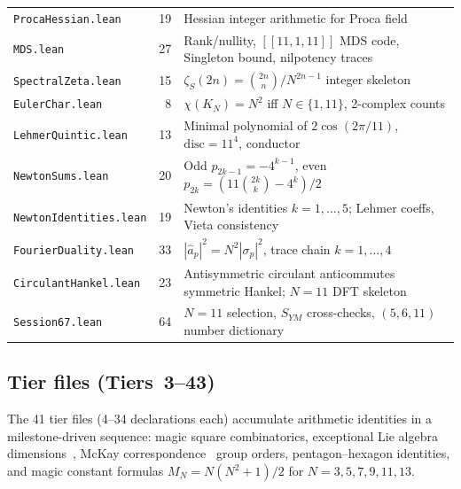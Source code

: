 \documentclass[11pt,a4paper]{article}
\begin{document}
\begin{table}[ht]
\begin{tabular}{lrp{8cm}}
\texttt{ProcaHessian.lean}       & 19 & Hessian integer arithmetic for Proca field \\
\texttt{MDS.lean}                & 27 & Rank/nullity, $[[11,1,11]]$ MDS code,
                                        Singleton bound, nilpotency traces \\
\texttt{SpectralZeta.lean}       & 15 & $\zeta_S(2n)=\binom{2n}{n}/N^{2n-1}$
                                        integer skeleton \\
\texttt{EulerChar.lean}          &  8 & $\chi(K_N)=N^2$ iff $N\in\{1,11\}$,
                                        2-complex counts \\
\texttt{LehmerQuintic.lean}      & 13 & Minimal polynomial of $2\cos(2\pi/11)$,
                                        $\mathrm{disc}=11^4$, conductor \\
\texttt{NewtonSums.lean}         & 20 & Odd $p_{2k-1}=-4^{k-1}$, even
                                        $p_{2k}=(11\binom{2k}{k}-4^k)/2$ \\
\texttt{NewtonIdentities.lean}   & 19 & Newton's identities $k=1,\ldots,5$;
                                        Lehmer coeffs, Vieta consistency \\
\texttt{FourierDuality.lean}     & 33 & $|\hat{a}_p|^2 = N^2|\sigma_p|^2$,
                                        trace chain $k=1,\ldots,4$ \\
\texttt{CirculantHankel.lean}    & 23 & Antisymmetric circulant anticommutes
                                        symmetric Hankel; $N=11$ DFT skeleton \\
\texttt{Session67.lean}          & 64 & $N=11$ selection, $S_{YM}$ cross-checks,
                                        $(5,6,11)$ number dictionary \\
\bottomrule
\end{tabular}
\end{table}

\subsection{Tier files (Tiers~3--43)}

The 41 tier files (4--34 declarations each) accumulate arithmetic
identities in a milestone-driven sequence: magic square combinatorics,
exceptional Lie algebra dimensions~\cite{e8_roots}, McKay
correspondence~\cite{mckay_correspondence} group orders, pentagon--hexagon
identities, and magic constant formulas $M_N = N(N^2+1)/2$ for
$N=3,5,7,9,11,13$.
\end{document}

